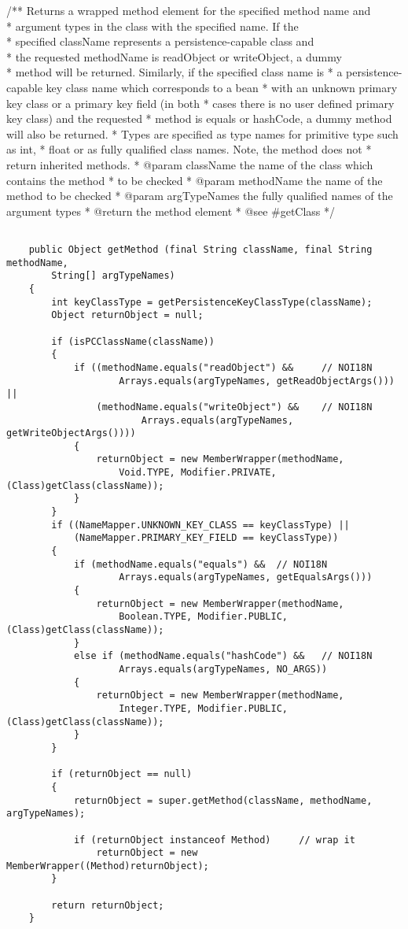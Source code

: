 /** Returns a wrapped method element for the specified method name and \\
	 * argument types in the class with the specified name.  If the \\
	 * specified className represents a persistence-capable class and \\
	 * the requested methodName is readObject or writeObject, a dummy \\
	 * method will be returned.  Similarly, if the specified class name is 
	 * a persistence-capable key class name which corresponds to a bean 
	 * with an unknown primary key class or a primary key field (in both 
	 * cases there is no user defined primary key class) and the requested 
	 * method is equals or hashCode, a dummy method will also be returned.  
	 * Types are specified as type names for primitive type such as int, 
	 * float or as fully qualified class names.  Note, the method does not 
	 * return inherited methods.
	 * @param className the name of the class which contains the method 
	 * to be checked
	 * @param methodName the name of the method to be checked
	 * @param argTypeNames the fully qualified names of the argument types
	 * @return the method element
	 * @see #getClass
	 */
\begin{lstlisting}
	
	public Object getMethod (final String className, final String methodName,
		String[] argTypeNames)
	{
		int keyClassType = getPersistenceKeyClassType(className);
		Object returnObject = null;

		if (isPCClassName(className))
		{
			if ((methodName.equals("readObject") && 	// NOI18N
                    Arrays.equals(argTypeNames, getReadObjectArgs())) ||
				(methodName.equals("writeObject") && 	// NOI18N
                        Arrays.equals(argTypeNames, getWriteObjectArgs())))
			{
				returnObject = new MemberWrapper(methodName, 
					Void.TYPE, Modifier.PRIVATE, (Class)getClass(className));
			}
		}
		if ((NameMapper.UNKNOWN_KEY_CLASS == keyClassType) || 
			(NameMapper.PRIMARY_KEY_FIELD == keyClassType))
		{
			if (methodName.equals("equals") && 	// NOI18N
                    Arrays.equals(argTypeNames, getEqualsArgs()))
			{
				returnObject = new MemberWrapper(methodName, 
					Boolean.TYPE, Modifier.PUBLIC, (Class)getClass(className));
			}
			else if (methodName.equals("hashCode") && 	// NOI18N
                    Arrays.equals(argTypeNames, NO_ARGS))
			{
				returnObject = new MemberWrapper(methodName, 
					Integer.TYPE, Modifier.PUBLIC, (Class)getClass(className));
			}
		}

		if (returnObject == null)
		{
			returnObject = super.getMethod(className, methodName, argTypeNames);

			if (returnObject instanceof Method)		// wrap it
				returnObject = new MemberWrapper((Method)returnObject);
		}

		return returnObject;
	}	
\end{lstlisting}

